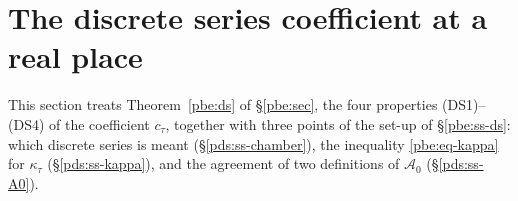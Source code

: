 \documentclass[10pt]{amsart}
\theoremstyle{definition}
\theoremstyle{remark}
\providecommand{\auAz}{\mathcal A_0}
\providecommand{\auPl}{\Phi}
\providecommand{\auU}{\mathrm U}
\providecommand{\aubar}[1]{\overline{#1}}
\begin{document}
\providecommand{\auO}{\mathcal O}
\providecommand{\auPl}{\Phi}
\providecommand{\auAz}{\mathcal A_0}
\providecommand{\auU}{\mathrm U}
\providecommand{\auA}{\mathbb A}
\providecommand{\aurd}{\mathrm{rd}_E}
\providecommand{\aubar}[1]{\overline{#1}}
\providecommand{\auf}[1]{\texttt{#1}}
\providecommand{\pbvol}{\operatorname{vol}}
\providecommand{\pbdeg}{\operatorname{deg}}
\providecommand{\pbip}[2]{\langle#1,#2\rangle}
\providecommand{\pbeq}{\mathsf q}
\providecommand{\pbW}{\mathbb W}
\providecommand{\pbel}{\ell}
\providecommand{\pdsK}{\mathbf K}
\providecommand{\pdsg}{\mathfrak g}
\providecommand{\pdsk}{\mathfrak k}
\providecommand{\pdsp}{\mathfrak p}
\providecommand{\pdsm}{m}
\providecommand{\pdsD}{\Delta^{\mathrm{min}}}
\providecommand{\pdsP}{P}
\providecommand{\pdsHS}[1]{\|#1\|_{2}}

\section{The discrete series coefficient at a real place}\label{pds:sec}

This section treats Theorem~\ref{pbe:ds} of \S\ref{pbe:sec}, the four properties
\textup{(DS1)}--\textup{(DS4)} of the coefficient $c_\tau$, together with three points of the
set-up of \S\ref{pbe:ss-ds}: which discrete series is meant (\S\ref{pds:ss-chamber}), the
inequality \eqref{pbe:eq-kappa} for $\kappa_\tau$ (\S\ref{pds:ss-kappa}), and the agreement of two
definitions of $\auAz$ (\S\ref{pds:ss-A0}).
\end{document}
